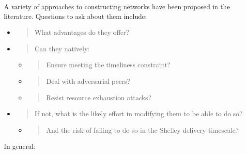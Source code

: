 \documentclass[11pt,a4paper]{article}
\begin{document}
A variety of approaches to constructing networks have been proposed in
the literature. Questions to ask about them include:

\begin{itemize}
\item
  \begin{quote}
  What advantages do they offer?
  \end{quote}
\item
  \begin{quote}
  Can they natively:
  \end{quote}

  \begin{itemize}
  \item
    \begin{quote}
    Ensure meeting the timeliness constraint?
    \end{quote}
  \item
    \begin{quote}
    Deal with adversarial peers?
    \end{quote}
  \item
    \begin{quote}
    Resist resource exhaustion attacks?
    \end{quote}
  \end{itemize}
\item
  \begin{quote}
  If not, what is the likely effort in modifying them to be able to do
  so?
  \end{quote}

  \begin{itemize}
  \item
    \begin{quote}
    And the risk of failing to do so in the Shelley delivery timescale?
    \end{quote}
  \end{itemize}
\end{itemize}

In general:
\end{document}
